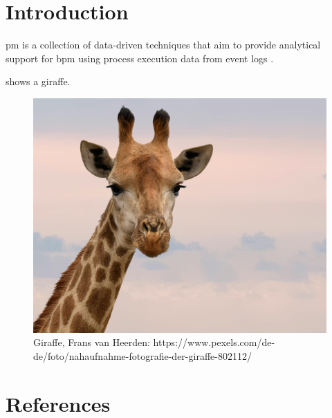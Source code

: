 

\clearpage

\begin{refsection}

\section{Introduction}
\label{a:sec:introduction}

\Ac{pm} is a collection of data-driven techniques that aim to provide analytical support for \ac{bpm} using process execution data from event logs \citep{Dumas.2018}. 

 shows a giraffe.

\begin{figure}
    \centering
    \includegraphics[width=0.5\linewidth]{figures/paper_a/pexels-frans-van-heerden-201846-802112.jpg}
    \caption{Giraffe, Frans van Heerden: https://www.pexels.com/de-de/foto/nahaufnahme-fotografie-der-giraffe-802112/ }
    \label{a:fig:giraffe}
\end{figure}

\section*{References}
\printbibliography[heading=none]
\end{refsection}